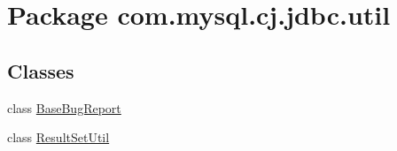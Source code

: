 \hypertarget{namespacecom_1_1mysql_1_1cj_1_1jdbc_1_1util}{}\section{Package com.\+mysql.\+cj.\+jdbc.\+util}
\label{namespacecom_1_1mysql_1_1cj_1_1jdbc_1_1util}
\subsection*{Classes}
\begin{DoxyCompactItemize}
\item 
class \mbox{\hyperlink{classcom_1_1mysql_1_1cj_1_1jdbc_1_1util_1_1_base_bug_report}{Base\+Bug\+Report}}
\item 
class \mbox{\hyperlink{classcom_1_1mysql_1_1cj_1_1jdbc_1_1util_1_1_result_set_util}{Result\+Set\+Util}}
\end{DoxyCompactItemize}
